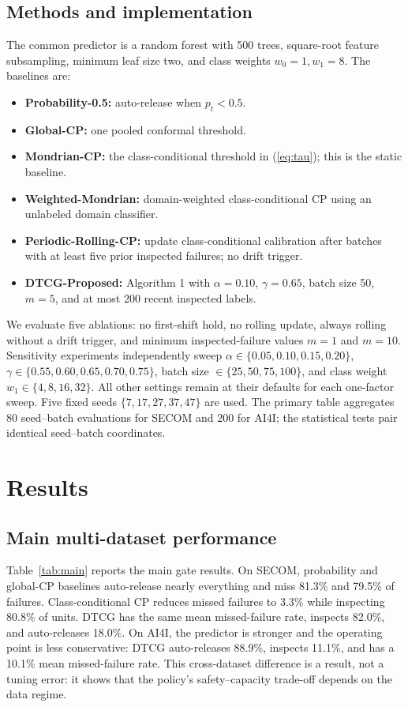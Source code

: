 \documentclass[journal]{IEEEtran}
\begin{document}
\subsection{Methods and implementation}
The common predictor is a random forest with 500 trees, square-root feature subsampling, minimum leaf size two, and class weights $w_0=1,w_1=8$. The baselines are:
\begin{itemize}
    \raggedright
    \item \textbf{Probability-0.5:} auto-release when $p_t<0.5$.
    \item \textbf{Global-CP:} one pooled conformal threshold.
    \item \textbf{Mondrian-CP:} the class-conditional threshold in (\ref{eq:tau}); this is the static baseline.
    \item \textbf{Weighted-Mondrian:} domain-weighted class-conditional CP using an unlabeled domain classifier.
    \item \textbf{Periodic-Rolling-CP:} update class-conditional calibration after batches with at least five prior inspected failures; no drift trigger.
    \item \textbf{DTCG-Proposed:} Algorithm 1 with $\alpha=0.10$, $\gamma=0.65$, batch size 50, $m=5$, and at most 200 recent inspected labels.
\end{itemize}

We evaluate five ablations: no first-shift hold, no rolling update, always rolling without a drift trigger, and minimum inspected-failure values $m=1$ and $m=10$. Sensitivity experiments independently sweep $\alpha\in\{0.05,0.10,0.15,0.20\}$, $\gamma\in\{0.55,0.60,0.65,0.70,0.75\}$, batch size $\in\{25,50,75,100\}$, and class weight $w_1\in\{4,8,16,32\}$. All other settings remain at their defaults for each one-factor sweep. Five fixed seeds $\{7,17,27,37,47\}$ are used. The primary table aggregates 80 seed--batch evaluations for SECOM and 200 for AI4I; the statistical tests pair identical seed--batch coordinates.

\section{Results}
\label{sec:results}

\subsection{Main multi-dataset performance}
Table~\ref{tab:main} reports the main gate results. On SECOM, probability and global-CP baselines auto-release nearly everything and miss 81.3\% and 79.5\% of failures. Class-conditional CP reduces missed failures to 3.3\% while inspecting 80.8\% of units. DTCG has the same mean missed-failure rate, inspects 82.0\%, and auto-releases 18.0\%. On AI4I, the predictor is stronger and the operating point is less conservative: DTCG auto-releases 88.9\%, inspects 11.1\%, and has a 10.1\% mean missed-failure rate. This cross-dataset difference is a result, not a tuning error: it shows that the policy's safety--capacity trade-off depends on the data regime.
\end{document}
